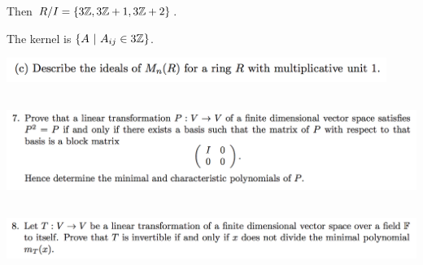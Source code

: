 \documentclass[12pt]{article}
\begin{document}
Then $R/I = \{3\mathbb{Z}, 3\mathbb{Z} + 1, 3\mathbb{Z} + 2\}$.

The kernel is $\{A ~|~ A_{ij} \in 3\mathbb{Z}\}$.

\newpage
\begin{mdframed}
\includegraphics[width=350pt]{img/linear-algebra-a0-1-6-c.png}\\
\end{mdframed}

\subsection*{} %
\begin{mdframed}
\includegraphics[width=400pt]{img/linear-algebra-a0-1-7.png}\\
\end{mdframed}

\subsection*{} %
\begin{mdframed}
\includegraphics[width=400pt]{img/linear-algebra-a0-1-8.png}\\
\end{mdframed}
\end{document}
